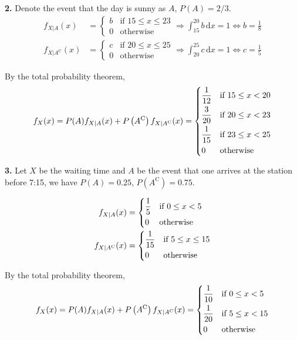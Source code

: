 \documentclass[a4paper,12pt]{article}
\newcommand{\C}{\mathrm C}
\newcommand{\ud}{\,\mathrm{d}}
\newcommand{\exercise}[1]{\noindent\textbf{#1.}}
\begin{document}
\exercise 2  Denote the event that the day is sunny as $A$, $P(A) = 2/3$.
\begin{align*}
  f_{X|A}(x) &= \begin{cases}
    b &\text{if }15 \le x \le 23\\
    0 &\text{otherwise}
  \end{cases}
  \Longrightarrow \int_{15}^{20}b\ud x = 1
  \iff b = \frac{1}{8}\\
  f_{X|A^\C}(x) &= \begin{cases}
    c &\text{if }20 \le x \le 25\\
    0 &\text{otherwise}
  \end{cases}
  \Longrightarrow \int_{20}^{25}c\ud x = 1
  \iff c = \frac{1}{5}
\end{align*}

By the total probability theorem,
\[f_X(x) = P(A)f_{X|A}(x) + P\left(A^\C\right)f_{X|A^\C}(x)
  = \begin{dcases}
    \frac{1}{12} &\text{if }15 \le x < 20\\
    \frac{3}{20} &\text{if }20 \le x < 23\\
    \frac{1}{15} &\text{if }23 \le x < 25\\
    0 &\text{otherwise}
  \end{dcases}\]

\exercise 3  Let $X$ be the waiting time
and $A$ be the event that one arrives at the station before 7:15,
we have $P(A) = 0.25$, $P\left(A^\C\right) = 0.75$.

\begin{align*}
  f_{X|A}(x) &= \begin{dcases}
    \frac{1}{5} &\text{if }0 \le x < 5\\
    0 &\text{otherwise}
  \end{dcases}\\
  f_{X|A^\C}(x) &= \begin{dcases}
    \frac{1}{15} &\text{if }5 \le x \le 15\\
    0 &\text{otherwise}
  \end{dcases}
\end{align*}

By the total probability theorem,
\[f_X(x) = P(A)f_{X|A}(x) + P\left(A^\C\right)f_{X|A^\C}(x)
  = \begin{dcases}
    \frac{1}{10} &\text{if }0 \le x < 5\\
    \frac{1}{20} &\text{if }5 \le x < 15\\
    0 &\text{otherwise}
  \end{dcases}\]
\end{document}
